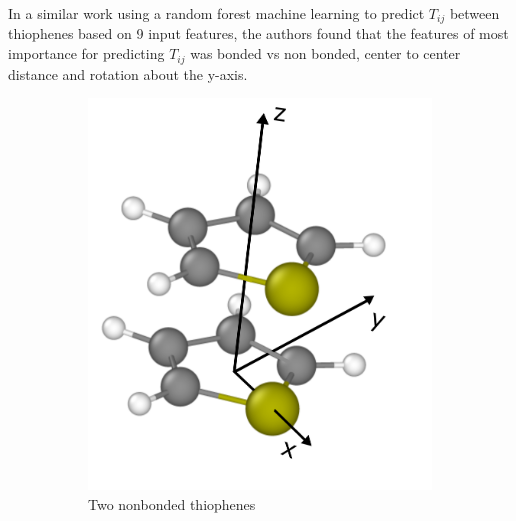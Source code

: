 In a similar work using a random forest machine learning to predict $T_{ij}$
between thiophenes based on 9 input features, the authors found that the
features of most importance for predicting $T_{ij}$ was bonded vs non bonded,
center to center distance and rotation about the y-axis. \cite{Jankowski2019c}

\begin{figure}[]
\centering
\begin{subfigure}{.4\textwidth}
    \centering
    \includegraphics[width=\textwidth]{figures/thiophene-axes.png}
    \caption{Two nonbonded thiophenes}
\end{subfigure}%
\\
\begin{subfigure}{.8\textwidth}
    \centering

\end{subfigure}
\end{figure}

